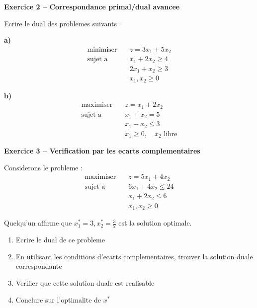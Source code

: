 \documentclass[12pt,a4paper]{article}
\begin{document}
\begin{exemple}
\textbf{Exercice 2 -- Correspondance primal/dual avancee}

Ecrire le dual des problemes suivants :

\textbf{a)}
\begin{align*}
\text{minimiser} \quad & z = 3x_1 + 5x_2\\
\text{sujet a} \quad & x_1 + 2x_2 \geq 4\\
& 2x_1 + x_2 \geq 3\\
& x_1, x_2 \geq 0
\end{align*}

\textbf{b)}
\begin{align*}
\text{maximiser} \quad & z = x_1 + 2x_2\\
\text{sujet a} \quad & x_1 + x_2 = 5\\
& x_1 - x_2 \leq 3\\
& x_1 \geq 0, \quad x_2 \text{ libre}
\end{align*}
\end{exemple}

\begin{exemple}
\textbf{Exercice 3 -- Verification par les ecarts complementaires}

Considerons le probleme :
\begin{align*}
\text{maximiser} \quad & z = 5x_1 + 4x_2\\
\text{sujet a} \quad & 6x_1 + 4x_2 \leq 24\\
& x_1 + 2x_2 \leq 6\\
& x_1, x_2 \geq 0
\end{align*}

Quelqu'un affirme que $x_1^* = 3, x_2^* = \frac{3}{2}$ est la solution optimale.

\begin{enumerate}
    \item Ecrire le dual de ce probleme
    \item En utilisant les conditions d'ecarts complementaires, trouver la solution duale correspondante
    \item Verifier que cette solution duale est realisable
    \item Conclure sur l'optimalite de $x^*$
\end{enumerate}
\end{exemple}
\end{document}
